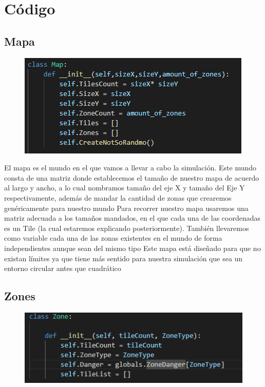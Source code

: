 \documentclass{llncs}
\begin{document}
\section{Código}

\subsection{Mapa}
\begin{figure}[]
	\centering
	\includegraphics[width=0.7\linewidth]{imagenes/mapa}
	\label{fig:mapa}
\end{figure}

El mapa es el mundo en el que vamos a llevar a cabo la simulación. Este mundo consta de una matriz donde establecemos el tamaño de nuestro mapa de acuerdo al largo y ancho, a lo cual nombramos tamaño del eje X y tamaño del Eje Y respectivamente, además de mandar la cantidad de zonas que crearemos genéricamente para nuestro mundo
\newline
\newline
Para recorrer nuestro mapa usaremos una matriz adecuada a los tamaños mandados, en el que cada una de las coordenadas es un Tile (la cual estaremos explicando posteriormente). También llevaremos como variable cada una de las zonas existentes en el mundo de forma independientes aunque sean del mismo tipo
\newline
\newline
Este mapa está diseñado para que no existan límites ya que tiene más sentido para nuestra simulación que sea un entorno circular antes que cuadrático

\subsection{Zones}
\begin{figure}
	\centering
	\includegraphics[width=0.7\linewidth]{imagenes/Zona}
	\label{fig:zona}
\end{figure}
\end{document}
